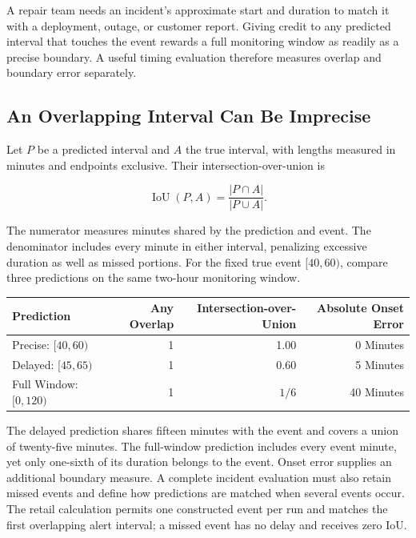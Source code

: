 \noindent \noindent A repair team needs an incident's approximate start and
duration to match it with a deployment, outage, or customer report.
Giving credit to any predicted interval that touches the event rewards a
full monitoring window as readily as a precise boundary. A useful timing
evaluation therefore measures overlap and boundary error separately.

\hypertarget{M07-an-overlapping-interval-can-be-imprecise}{%
\subsection{An Overlapping Interval Can Be
Imprecise}\label{M07-an-overlapping-interval-can-be-imprecise}}

\noindent \noindent Let \(P\) be a predicted interval and \(A\) the true interval,
with lengths measured in minutes and endpoints exclusive. Their
intersection-over-union is

\[
\operatorname{IoU}(P,A)=\frac{|P\cap A|}{|P\cup A|}.
\]

The numerator measures minutes shared by the prediction and event. The
denominator includes every minute in either interval, penalizing
excessive duration as well as missed portions. For the fixed true event
\([40,60)\), compare three predictions on the same two-hour monitoring
window.

\begin{table}[H]
\centering\small
\begin{tabular}{@{}lrrr@{}}
\toprule
Prediction & Any Overlap & Intersection-over-Union & Absolute Onset
Error \\
\midrule

Precise: \([40,60)\) & 1 & 1.00 & 0 Minutes \\
Delayed: \([45,65)\) & 1 & 0.60 & 5 Minutes \\
Full Window: \([0,120)\) & 1 & \(1/6\) & 40 Minutes \\
\bottomrule
\end{tabular}
\end{table}

The delayed prediction shares fifteen minutes with the event and covers
a union of twenty-five minutes. The full-window prediction includes
every event minute, yet only one-sixth of its duration belongs to the
event. Onset error supplies an additional boundary measure. A complete
incident evaluation must also retain missed events and define how
predictions are matched when several events occur. The retail
calculation permits one constructed event per run and matches the first
overlapping alert interval; a missed event has no delay and receives
zero IoU.

